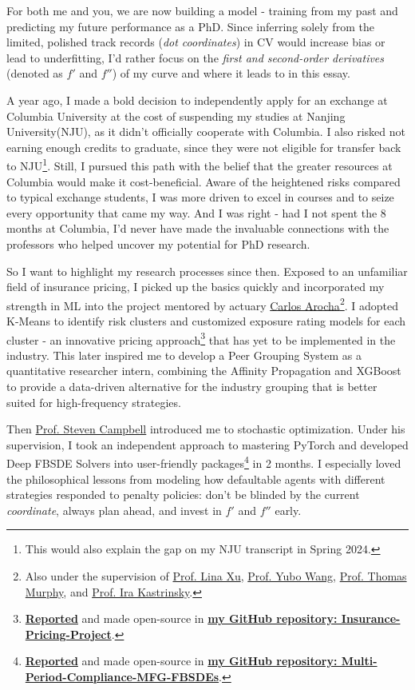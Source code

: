 \documentclass[12pt, a4paper]{article}
\newcommand{\MFGReport}{\href{https://github.com/OrangeAoo/Multi-Compliance-MFG-FBSDEs/blob/ca6adb57636c1fc1ff9daea8d57f004e5762fd4d/FinalReports/Report-v3.pdf}{\textbf{Reported}}\xspace}
\newcommand{\GitHubMFG}{\href{https://github.com/OrangeAoo/Multi-Period-Compliance-MFG-FBSDEs}{\textbf{my GitHub repository: Multi-Period-Compliance-MFG-FBSDEs}}\xspace}
\newcommand{\IPReport}{\href{https://github.com/OrangeAoo/Insurance-Pricing-Project/blob/intproj/Pres-And-Reports/Final/Final-Report-Insurance-Pricing-2408.pdf}{\textbf{Reported}}\xspace}
\newcommand{\GitHubIP}{\href{https://github.com/OrangeAoo/Insurance-Pricing-Project}{\textbf{my GitHub repository: Insurance-Pricing-Project}}\xspace}
\newcommand{\NJU}{Nanjing University\xspace}
\newcommand{\CU}{Columbia University\xspace}
\newcommand{\SC}{\href{https://www.stevenacampbell.com/}{Prof. Steven Campbell}\xspace}
\newcommand{\CA}{\href{https://www.linkedin.com/in/carocha/?originalSubdomain=ch}{Carlos Arocha}\xspace}
\newcommand{\LX}{\href{https://sps.columbia.edu/person/lina-xu}{Prof. Lina Xu}}
\newcommand{\YW}{\href{https://sps.columbia.edu/person/yubo-wang-phd}{Prof. Yubo Wang}\xspace}
\newcommand{\Tom}{\href{https://sps.columbia.edu/person/thomas-murphy}{Prof. Thomas Murphy}\xspace}
\newcommand{\Ira}{\href{https://sps.columbia.edu/person/ira-kastrinsky}{Prof. Ira Kastrinsky}\xspace}
\begin{document}
For both me and you, we are now building a model - training from my past and predicting my future performance as a PhD. Since inferring solely from the limited, polished track records (\textit{dot coordinates}) in CV would increase bias or lead to underfitting, I'd rather focus on the \textit{first and second-order derivatives} (denoted as $f'$ and $f''$) of my curve and where it leads to in this essay.

A year ago, I made a bold decision to independently apply for an exchange at \CU at the cost of suspending my studies at \NJU (NJU), as it didn't officially cooperate with Columbia. I also risked not earning enough credits to graduate, since they were not eligible for transfer back to NJU\footnote{This would also explain the gap on my NJU transcript in Spring 2024.}. Still, I pursued this path with the belief that the greater resources at Columbia would make it cost-beneficial. Aware of the heightened risks compared to typical exchange students, I was more driven to excel in courses and to seize every opportunity that came my way. And I was right - had I not spent the 8 months at Columbia, I'd never have made the invaluable connections with the professors who helped uncover my potential for PhD research.

So I want to highlight my research processes since then. Exposed to an unfamiliar field of insurance pricing, I picked up the basics quickly and incorporated my strength in ML into the project mentored by actuary \CA\footnote{Also under the supervision of \LX, \YW, \Tom, and \Ira.}. I adopted K-Means to identify risk clusters and customized exposure rating models for each cluster - an innovative pricing approach\footnote{\IPReport and made open-source in \GitHubIP.} that has yet to be implemented in the industry. This later inspired me to develop a Peer Grouping System as a quantitative researcher intern, combining the Affinity Propagation and XGBoost to provide a data-driven alternative for the industry grouping that is better suited for high-frequency strategies. 

Then \SC introduced me to stochastic optimization. Under his supervision, I took an independent approach to mastering PyTorch and developed Deep FBSDE Solvers into user-friendly packages\footnote{\MFGReport and made open-source in \GitHubMFG.} in 2 months. I especially loved the philosophical lessons from modeling how defaultable agents with different strategies responded to penalty policies: don't be blinded by the current \textit{coordinate}, always plan ahead, and invest in $f'$ and $f''$ early. 
\end{document}

